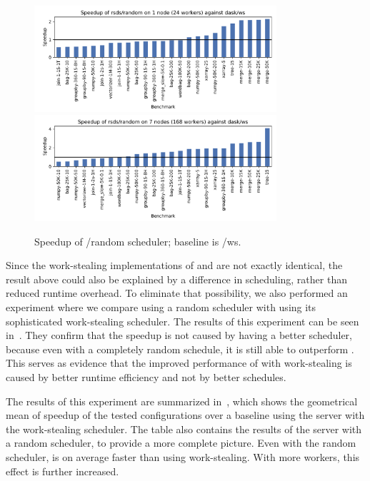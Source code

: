 \begin{figure}
	\centering
	\includegraphics[width=0.8\textwidth]{./imgs/rsds/charts/speedup-rsds-random-1}
	\includegraphics[width=0.8\textwidth]{./imgs/rsds/charts/speedup-rsds-random-7}
	\caption{Speedup of \rsds{}/random scheduler; baseline is \dask{}/ws.}
	\label{fig:rsds-dask-random-all}
\end{figure}

Since the work-stealing implementations of \rsds{} and
\dask{} are not exactly identical, the result above could also be explained by
a difference in scheduling, rather than reduced runtime overhead. To eliminate that possibility, we
also performed an experiment where we compare \rsds{} using a random scheduler
with \dask{} using its sophisticated work-stealing scheduler. The results of
this experiment can be seen in~. They confirm that the speedup is not
caused by \rsds{} having a better scheduler, because even with a completely
random schedule, it is still able to outperform \dask{}. This serves as
evidence that the improved performance of \rsds{} with work-stealing is caused
by better runtime efficiency and not by better schedules.

The results of this experiment are summarized in~, which shows the
geometrical mean of speedup of the tested \rsds{} configurations over a
baseline using the \dask{} server with the work-stealing scheduler. The table
also contains the results of the \dask{} server with a random scheduler, to
provide a more complete picture. Even with the random scheduler, \rsds{} is on
average faster than \dask{} using work-stealing. With more workers, this effect
is further increased.

